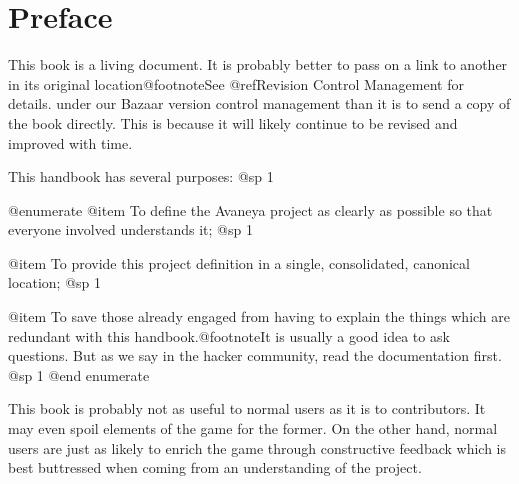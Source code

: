 \chapter{Preface}

This book is a living document. It is probably better to pass on a link to another in its original location@footnote{See @ref{Revision Control Management} for details.} under our Bazaar version control management than it is to send a copy of the book directly. This is because it will likely continue to be revised and improved with time.

This handbook has several purposes:
@sp 1

@enumerate
@item
To define the Avaneya project as clearly as possible so that everyone involved understands it;
@sp 1

@item
To provide this project definition in a single, consolidated, canonical location;
@sp 1

@item
To save those already engaged from having to explain the things which are redundant with this handbook.@footnote{It is usually a good idea to ask questions. But as we say in the hacker community, read the documentation first.}
@sp 1
@end enumerate

This book is probably not as useful to normal users as it is to contributors. It may even spoil elements of the game for the former. On the other hand, normal users are just as likely to enrich the game through constructive feedback which is best buttressed when coming from an understanding of the project.


